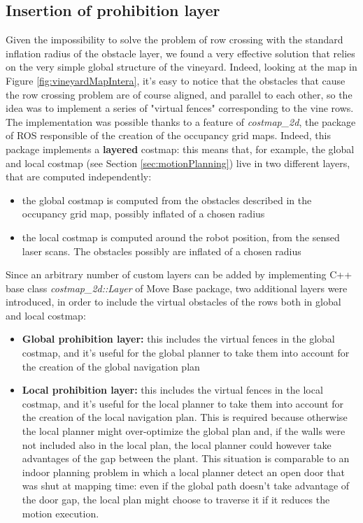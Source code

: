 \subsection{Insertion of prohibition layer}\label{subsec:virtualFences}
Given the impossibility to solve the problem of row crossing with the standard inflation radius of the obstacle layer, we found a very effective solution that relies on the very simple global structure of the vineyard. Indeed, looking at the map in Figure \ref{fig:vineyardMapIntera}, it's easy to notice that the obstacles that cause the row crossing problem are of course aligned, and parallel to each other, so the idea was to implement a series of "virtual fences" corresponding to the vine rows. The implementation was possible thanks to a feature of \textit{costmap\_2d}, the package of \ac{ROS} responsible of the creation of the occupancy grid maps. Indeed, this package implements a \textbf{layered} costmap: this means that, for example, the global and local costmap (see Section \ref{sec:motionPlanning}) live in two different layers, that are computed independently:
\begin{itemize}
	\item the global costmap is computed from the obstacles described in the occupancy grid map, possibly inflated of a chosen radius
	\item the local costmap is computed around the robot position, from the sensed laser scans. The obstacles possibly are inflated of a chosen radius
\end{itemize}
Since an arbitrary number of custom layers can be added by implementing C++ base class \textit{costmap\_2d::Layer} of Move Base package, two additional layers were introduced, in order to include the virtual obstacles of the rows both in global and local costmap:
\begin{itemize}
	\item \textbf{Global prohibition layer:} this includes the virtual fences in the global costmap, and it's useful for the global planner to take them into account for the creation of the global navigation plan
	\item \textbf{Local prohibition layer:} this includes the virtual fences in the local costmap, and it's useful for the local planner to take them into account for the creation of the local navigation plan. This is required because otherwise the local planner might over-optimize the global plan and, if the walls were not included also in the local plan, the local planner could however take advantages of the gap between the plant. This situation is comparable to an indoor planning problem in which a local planner detect an open door that was shut at mapping time: even if the global path doesn't take advantage of the door gap, the local plan might choose to traverse it if it reduces the motion execution.
\end{itemize}

